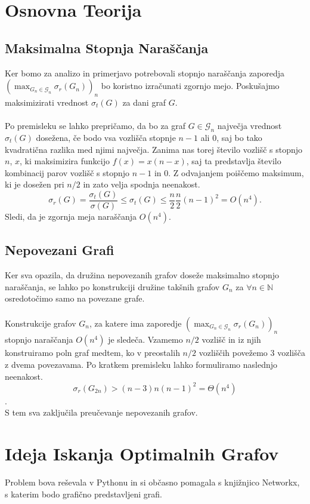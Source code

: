 \documentclass[ letterpaper, titlepage, fleqn]{article}
\begin{document}
\section{Osnovna Teorija}

\subsection{Maksimalna Stopnja Naraščanja}
Ker bomo za analizo in primerjavo potrebovali stopnjo naraščanja
zaporedja $(\max_{G_n \in \mathscr{G}_n} \sigma_r(G_n))_n$ bo koristno izračunati zgornjo mejo.
Poskušajmo maksimizirati vrednost $\sigma_t(G)$ za dani graf $G$.
\\\\
Po premisleku se lahko prepričamo, da bo za graf $G \in \mathscr{G}_n$ največja vrednost $\sigma_t(G)$ dosežena, če
bodo vsa vozlišča stopnje $n - 1$ ali $0$, saj bo tako kvadratična razlika med njimi največja.
Zanima nas torej število vozlišč s stopnjo $n$, $x$, ki maksimizira funkcijo
$f(x) = x (n - x)$, saj ta predstavlja število kombinacij parov vozlišč s stopnjo $n - 1$ in $0$.
Z odvajanjem poiščemo maksimum, ki je dosežen pri $n / 2$ in zato velja spodnja neenakost.
$$
\sigma_r(G) = \frac{\sigma_t(G)}{\sigma(G)} 
\leq \sigma_t(G) \leq \frac{n}{2} \frac{n}{2} (n - 1)^2 
= O(n^4).
$$
Sledi, da je zgornja meja naraščanja $O(n^4)$.

\subsection{Nepovezani Grafi}
Ker sva opazila, da družina nepovezanih grafov doseže maksimalno stopnjo naraščanja,
se lahko po konstrukciji družine takšnih grafov $G_n$ za $\forall n \in \mathbb{N}$
osredotočimo samo na povezane grafe.
\\\\
Konstrukcije grafov $G_n$, za katere ima zaporedje  $(\max_{G_n \in \mathscr{G}_n} \sigma_r(G_n))_n$  stopnjo 
naraščanja $O(n^4)$ je sledeča.
Vzamemo $n / 2$ vozlišč in iz njih konstruiramo poln graf
medtem, ko v preostalih $n /2$ vozliščih povežemo 3 vozlišča z dvema povezavama.
Po kratkem premisleku lahko formuliramo naslednjo neenakost.
$$\sigma_r(G_{2n}) > (n - 3) n (n - 1)^2 = \Theta(n^4)$$.
\\
S tem sva zaključila preučevanje nepovezanih grafov.

\section{Ideja Iskanja Optimalnih Grafov}
Problem bova reševala v Pythonu in si občasno pomagala s knjižnjico Networkx,  
s katerim bodo grafično predstavljeni grafi.
\end{document}
